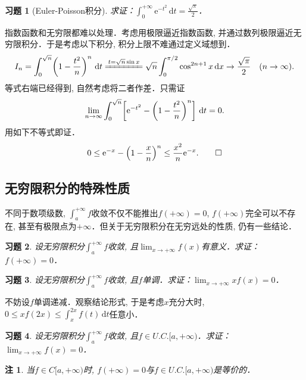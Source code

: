 \documentclass[11pt,a4paper]{ctexart}
\makeatletter
\theoremstyle{thmseries} %
\theoremstyle{exerseries}
\newtheorem{exer}{习题}[section]
\newtheorem*{rem}{注}
\renewenvironment{proof}[1][\proofname]{\par
  \pushQED{\qed}%
  \normalfont \topsep6\p@\@plus6\p@\relax
  \trivlist
  \item[\hskip\labelsep
        \itshape
    #1\@addpunct{}]\ignorespaces
}{%
  \popQED\endtrivlist\@endpefalse
}
\newenvironment{pf}{\begin{proof}[\bfseries\upshape 证\quad]}{\end{proof}}
\newcommand{\bra}[1]{\mathopen{}\left(#1\right)}
\newcommand{\sbra}[1]{\mathopen{}\left[#1\right]}
\renewcommand{\d}{\mathrm{d}}
\newcommand{\e}{\mathrm{e}}
\def \nti {\mathnormal{n}\to\infty}
\makeatother
\begin{document}
\begin{exer}[Euler-Poisson积分]
	求证：$\int_{0}^{+\infty}\e^{-t^2}\,\d t=\frac{\sqrt{\pi}}{2}$．
\end{exer}
\begin{pf}
	指数函数和无穷限都难以处理．考虑用极限逼近指数函数, 并通过数列极限逼近无穷限积分．于是考虑以下积分, 积分上限不难通过定义域想到．
	\[I_n=\int_{0}^{\sqrt{n}}\bra{1-\frac{t^2}{n}}^n\,\d t\xlongequal{t=\sqrt{n}\sin x}\sqrt{n}\int_{0}^{\pi/2}\cos^{2n+1}x\,\d x\to\frac{\sqrt{\pi}}{2}\quad(\nti).\]
	等式右端已经得到, 自然考虑将二者作差．只需证
	\[\lim_{\nti}\int_{0}^{\sqrt{n}}\sbra{\e^{-t^2}-\bra{1-\frac{t^2}{n}}^n}\,\d t=0.\]
	用如下不等式即证．
	\[0\leq\e^{-x}-\bra{1-\frac{x}{n}}^n\leq\frac{x^2}{n}\e^{-x}.\qedhere\]
\end{pf}


\subsection{无穷限积分的特殊性质}
不同于数项级数, $\int_{a}^{+\infty}f$收敛不仅不能推出$f(+\infty)=0$, $f(+\infty)$完全可以不存在, 甚至有极限点为$+\infty$．但关于无穷限积分在无穷远处的性质, 仍有一些结论．
\begin{exer}
	设无穷限积分$\int_{a}^{+\infty}f$收敛, 且$\lim_{x\to+\infty}f(x)$有意义．求证：$f(+\infty)=0$．
\end{exer}
\begin{exer}
	设无穷限积分$\int_{a}^{+\infty}f$收敛, 且$f$单调．求证：$\lim_{x\to+\infty}xf(x)=0$．
\end{exer}
\begin{pf}
	不妨设$f$单调递减．观察结论形式, 于是考虑$x$充分大时, $0\leq xf(2x)\leq\int_{x}^{2x}f(t)\,\d t$任意小．
\end{pf}
\begin{exer}
	设无穷限积分$\int_{a}^{+\infty}f$收敛, 且$f\in U.C.[a,+\infty)$．求证：$\lim_{x\to+\infty}f(x)=0$．
\end{exer}
\begin{rem}
	当$f\in C[a,+\infty)$时, $f(+\infty)=0$与$f\in U.C.[a,+\infty)$是等价的．
\end{rem}
\end{document}
